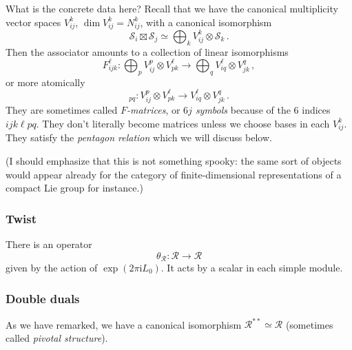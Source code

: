 \documentclass[12pt,letterpaper,reqno]{amsart}
\numberwithin{equation}{section}
\newcommand{\cS}{\ensuremath{\mathcal S}}
\newcommand{\I}{{\mathrm i}}
\newcommand{\vrep}{\mathcal{R}}
\newcommand{\ti}[1]{\textit{#1}}
\begin{document}
What is the concrete data here? Recall that we have the canonical multiplicity vector spaces $V_{ij}^k$, $\dim V_{ij}^k = N_{ij}^k$, 
with a canonical isomorphism
\begin{equation}
  \cS_i \boxtimes \cS_j \simeq \bigoplus_{k} V_{ij}^k \otimes \cS_k \, .
\end{equation}
Then the associator amounts to a collection of linear isomorphisms
\begin{equation}
  F^\ell_{ijk}: \bigoplus_p V^p_{ij} \otimes V^\ell_{pk} \to \bigoplus_q V^\ell_{iq} \otimes V^q_{jk} \, ,
\end{equation}
or more atomically
\begin{equation}
  [F^\ell_{ijk}]_{pq}: V^p_{ij} \otimes V^\ell_{pk} \to V^\ell_{iq} \otimes V^q_{jk} \, .
\end{equation}
They are sometimes called \ti{$F$-matrices}, or \ti{$6j$ symbols} because
of the $6$ indices $ijk\ell{}pq$.
They don't literally become matrices unless we choose bases in
each $V_{ij}^k$.
They satisfy the \ti{pentagon relation} which we will discuss below.

(I should emphasize that this is not something spooky:
the same sort of objects would appear already for the
category of finite-dimensional representations of a compact
Lie group for instance.)



\subsubsection{Twist}

There is an operator
\begin{equation}
  \theta_\vrep: \vrep \to \vrep
\end{equation}
given by the action of $\exp(2 \pi \I L_0)$.
It acts by a scalar in each simple module.


\subsubsection{Double duals}

As we have remarked, we have a canonical isomorphism
$\vrep^{**} \simeq \vrep$ (sometimes called \ti{pivotal structure}).
\end{document}
